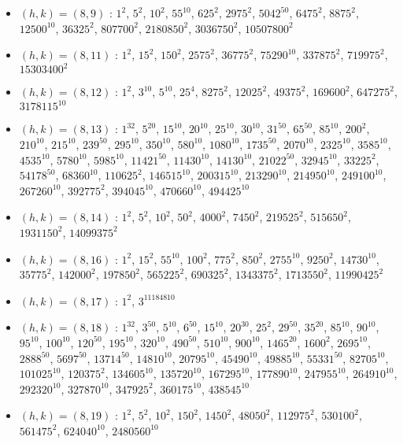 \begin{itemize}
\item $(h,k)=(8,9)$ : $1^{2}$, $5^{2}$, $10^{2}$, $55^{10}$, $625^{2}$, $2975^{2}$, $5042^{50}$, $6475^{2}$, $8875^{2}$, $12500^{10}$, $36325^{2}$, $807700^{2}$, $2180850^{2}$, $3036750^{2}$, $10507800^{2}$
\item $(h,k)=(8,11)$ : $1^{2}$, $15^{2}$, $150^{2}$, $2575^{2}$, $36775^{2}$, $75290^{10}$, $337875^{2}$, $719975^{2}$, $15303400^{2}$
\item $(h,k)=(8,12)$ : $1^{2}$, $3^{10}$, $5^{10}$, $25^{4}$, $8275^{2}$, $12025^{2}$, $49375^{2}$, $169600^{2}$, $647275^{2}$, $3178115^{10}$
\item $(h,k)=(8,13)$ : $1^{32}$, $5^{20}$, $15^{10}$, $20^{10}$, $25^{10}$, $30^{10}$, $31^{50}$, $65^{50}$, $85^{10}$, $200^{2}$, $210^{10}$, $215^{10}$, $239^{50}$, $295^{10}$, $350^{10}$, $580^{10}$, $1080^{10}$, $1735^{50}$, $2070^{10}$, $2325^{10}$, $3585^{10}$, $4535^{10}$, $5780^{10}$, $5985^{10}$, $11421^{50}$, $11430^{10}$, $14130^{10}$, $21022^{50}$, $32945^{10}$, $33225^{2}$, $54178^{50}$, $68360^{10}$, $110625^{2}$, $146515^{10}$, $200315^{10}$, $213290^{10}$, $214950^{10}$, $249100^{10}$, $267260^{10}$, $392775^{2}$, $394045^{10}$, $470660^{10}$, $494425^{10}$
\item $(h,k)=(8,14)$ : $1^{2}$, $5^{2}$, $10^{2}$, $50^{2}$, $4000^{2}$, $7450^{2}$, $219525^{2}$, $515650^{2}$, $1931150^{2}$, $14099375^{2}$
\item $(h,k)=(8,16)$ : $1^{2}$, $15^{2}$, $55^{10}$, $100^{2}$, $775^{2}$, $850^{2}$, $2755^{10}$, $9250^{2}$, $14730^{10}$, $35775^{2}$, $142000^{2}$, $197850^{2}$, $565225^{2}$, $690325^{2}$, $1343375^{2}$, $1713550^{2}$, $11990425^{2}$
\item $(h,k)=(8,17)$ : $1^{2}$, $3^{11184810}$
\item $(h,k)=(8,18)$ : $1^{32}$, $3^{50}$, $5^{10}$, $6^{50}$, $15^{10}$, $20^{30}$, $25^{2}$, $29^{50}$, $35^{20}$, $85^{10}$, $90^{10}$, $95^{10}$, $100^{10}$, $120^{50}$, $195^{10}$, $320^{10}$, $490^{50}$, $510^{10}$, $900^{10}$, $1465^{20}$, $1600^{2}$, $2695^{10}$, $2888^{50}$, $5697^{50}$, $13714^{50}$, $14810^{10}$, $20795^{10}$, $45490^{10}$, $49885^{10}$, $55331^{50}$, $82705^{10}$, $101025^{10}$, $120375^{2}$, $134605^{10}$, $135720^{10}$, $167295^{10}$, $177890^{10}$, $247955^{10}$, $264910^{10}$, $292320^{10}$, $327870^{10}$, $347925^{2}$, $360175^{10}$, $438545^{10}$
\item $(h,k)=(8,19)$ : $1^{2}$, $5^{2}$, $10^{2}$, $150^{2}$, $1450^{2}$, $48050^{2}$, $112975^{2}$, $530100^{2}$, $561475^{2}$, $624040^{10}$, $2480560^{10}$

\end{itemize}
